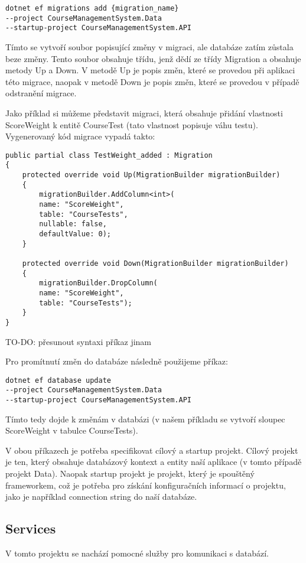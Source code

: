 \begin{lstlisting}
dotnet ef migrations add {migration_name} 
--project CourseManagementSystem.Data 
--startup-project CourseManagementSystem.API
\end{lstlisting}

Tímto se vytvoří soubor popisující změny v migraci, ale databáze zatím zůstala beze změny. Tento soubor obsahuje třídu, jenž dědí ze třídy Migration a obsahuje metody Up a Down. V metodě Up je popis změn, které se provedou při aplikaci této migrace, naopak v metodě Down je popis změn, které se provedou v případě odstranění migrace.

Jako příklad si můžeme představit migraci, která obsahuje přidání vlastnosti ScoreWeight k entitě CourseTest (tato vlastnost popisuje váhu testu).
Vygenerovaný kód migrace vypadá takto:

\begin{lstlisting}
public partial class TestWeight_added : Migration
{
	protected override void Up(MigrationBuilder migrationBuilder)
	{
		migrationBuilder.AddColumn<int>(
		name: "ScoreWeight",
		table: "CourseTests",
		nullable: false,
		defaultValue: 0);
	}
	
	protected override void Down(MigrationBuilder migrationBuilder)
	{
		migrationBuilder.DropColumn(
		name: "ScoreWeight",
		table: "CourseTests");
	}
}
\end{lstlisting}

TO-DO: přesunout syntaxi příkaz jinam

Pro promítnutí změn do databáze následně použijeme příkaz:

\begin{lstlisting}
dotnet ef database update 
--project CourseManagementSystem.Data 
--startup-project CourseManagementSystem.API
\end{lstlisting}

Tímto tedy dojde k změnám v databázi (v našem příkladu se vytvoří sloupec ScoreWeight v tabulce CourseTests).

V obou příkazech je potřeba specifikovat cílový a startup projekt. Cílový projekt je ten, který obsahuje databázový kontext a entity naší aplikace (v tomto případě projekt Data). Naopak startup projekt je projekt, který je spouštěný frameworkem, což je potřeba pro získání konfiguračních informací o projektu, jako je například connection string do naší databáze.

\newpage

\subsection{Services}
V tomto projektu se nachází pomocné služby pro komunikaci s databází. 

